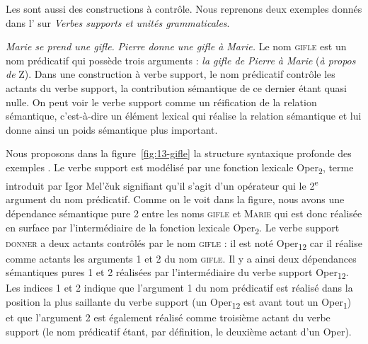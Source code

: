 Les  sont aussi des constructions à contrôle. Nous reprenons deux exemples donnés dans l’ sur \textit{Verbes supports et unités grammaticales}.

\ea\label{ex:13-gifle}
\ea \textit{Marie se prend une gifle.}
\ex \textit{Pierre donne une gifle à Marie.}\z\z
Le nom \textsc{gifle} est un nom prédicatif qui possède trois arguments : \textit{la gifle de Pierre à Marie} (\textit{à propos de} Z). Dans une construction à verbe support, le nom prédicatif contrôle les actants du verbe support, la contribution sémantique de ce dernier étant quasi nulle. On peut voir le verbe support comme un réification de la relation sémantique, c’est-à-dire un élément lexical qui réalise la relation sémantique et lui donne ainsi un poids sémantique plus important.

Nous proposons dans la figure~\ref{fig:13-gifle} la structure syntaxique profonde des exem\-ples . Le verbe support  est modélisé par une fonction lexicale Oper\textsubscript{2}, terme introduit par Igor Mel’\v cuk signifiant qu’il s’agit d’un opérateur qui  le 2\textsuperscript{e} argument du nom prédicatif. Comme on le voit dans la figure, nous avons une dépendance sémantique pure 2 entre les noms \textsc{gifle} et \textsc{Marie} qui est donc réalisée en surface par l'intermédiaire de la fonction lexicale Oper\textsubscript{2}. Le verbe support \textsc{donner} a deux actants contrôlés par le nom \textsc{gifle} : il est noté Oper\textsubscript{12} car il réalise comme actants les arguments 1 et 2 du nom \textsc{gifle}. Il y a ainsi deux dépendances sémantiques pures 1 et 2 réalisées par l'intermédiaire du verbe support Oper\textsubscript{12}. Les indices 1 et 2 indique que l'argument 1 du nom prédicatif est réalisé dans la position la plus saillante du verbe support (un Oper\textsubscript{12} est avant tout un Oper\textsubscript{1}) et que l'argument 2 est également réalisé comme troisième actant du verbe support (le nom prédicatif étant, par définition, le deuxième actant d'un Oper).

